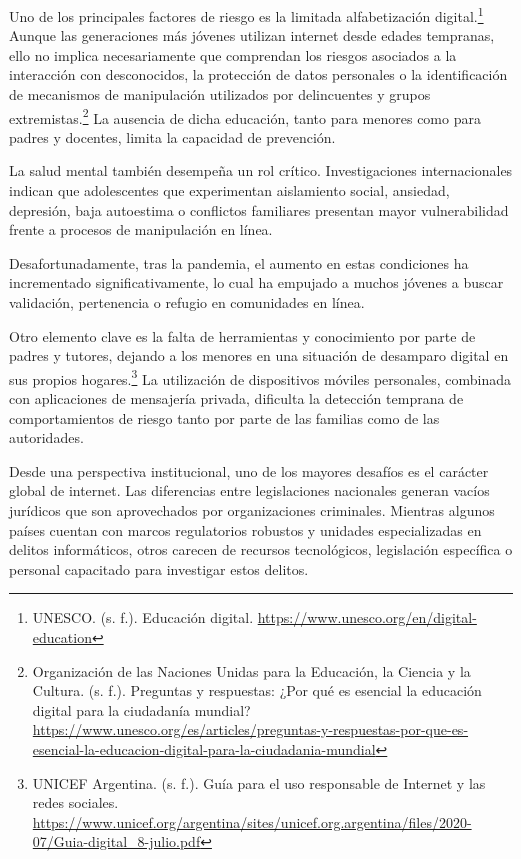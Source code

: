 Uno de los principales factores de riesgo es la limitada alfabetización digital.\footnote{UNESCO. (s. f.). Educación digital. \url{https://www.unesco.org/en/digital-education}} Aunque las generaciones más jóvenes utilizan internet desde edades tempranas, ello no implica necesariamente que comprendan los riesgos asociados a la interacción con desconocidos, la protección de datos personales o la identificación de mecanismos de manipulación utilizados por delincuentes y grupos extremistas.\footnote{Organización de las Naciones Unidas para la Educación, la Ciencia y la Cultura. (s. f.). Preguntas y respuestas: ¿Por qué es esencial la educación digital para la ciudadanía mundial? \url{https://www.unesco.org/es/articles/preguntas-y-respuestas-por-que-es-esencial-la-educacion-digital-para-la-ciudadania-mundial}} La ausencia de dicha educación, tanto para menores como para padres y docentes, limita la capacidad de prevención.

La salud mental también desempeña un rol crítico. Investigaciones internacionales indican que adolescentes que experimentan aislamiento social, ansiedad, depresión, baja autoestima o conflictos familiares presentan mayor vulnerabilidad frente a procesos de manipulación en línea.

Desafortunadamente, tras la pandemia, el aumento en estas condiciones ha incrementado significativamente, lo cual ha empujado a muchos jóvenes a buscar validación, pertenencia o refugio en comunidades en línea.

Otro elemento clave es la falta de herramientas y conocimiento por parte de padres y tutores, dejando a los menores en una situación de desamparo digital en sus propios hogares.\footnote{UNICEF Argentina. (s. f.). Guía para el uso responsable de Internet y las redes sociales. \url{https://www.unicef.org/argentina/sites/unicef.org.argentina/files/2020-07/Guia-digital_8-julio.pdf}} La utilización de dispositivos móviles personales, combinada con aplicaciones de mensajería privada, dificulta la detección temprana de comportamientos de riesgo tanto por parte de las familias como de las autoridades.

Desde una perspectiva institucional, uno de los mayores desafíos es el carácter global de internet. Las diferencias entre legislaciones nacionales generan vacíos jurídicos que son aprovechados por organizaciones criminales. Mientras algunos países cuentan con marcos regulatorios robustos y unidades especializadas en delitos informáticos, otros carecen de recursos tecnológicos, legislación específica o personal capacitado para investigar estos delitos.

